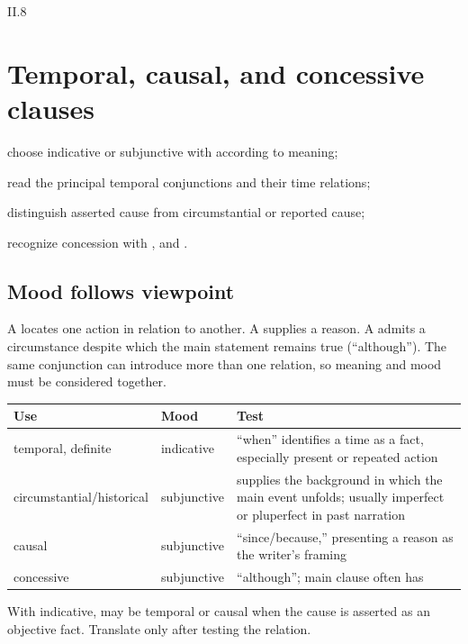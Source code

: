 \begin{courseunit}{II.8}
\chapter{Temporal, causal, and concessive clauses}

\begin{learningobjectives}
  \item choose indicative or subjunctive with  according to meaning;
  \item read the principal temporal conjunctions and their time relations;
  \item distinguish asserted cause from circumstantial or reported cause;
  \item recognize concession with , and .
\end{learningobjectives}

\section{Mood follows viewpoint}

A  locates one action in relation to another. A
 supplies a reason. A  admits a
circumstance despite which the main statement remains true (``although''). The
same conjunction can introduce more than one relation, so meaning and mood
must be considered together.

\begin{grammarbox}{}
\begin{tabularx}{\linewidth}{@{}P{1.7in}P{1.0in}Y@{}}
\toprule
\textbf{Use} & \textbf{Mood} & \textbf{Test}\\ \midrule
temporal, definite & indicative & ``when'' identifies a time as a fact, especially present or
repeated action\\
circumstantial/historical & subjunctive & supplies the background in which the main event
unfolds; usually imperfect or pluperfect in past narration\\
causal & subjunctive & ``since/because,'' presenting a reason as the writer's framing\\
concessive & subjunctive & ``although''; main clause often has \\
\bottomrule
\end{tabularx}

With indicative,  may be temporal or causal when the cause is asserted as an
objective fact.  Translate only after testing the relation.
\end{grammarbox}


\end{courseunit}
